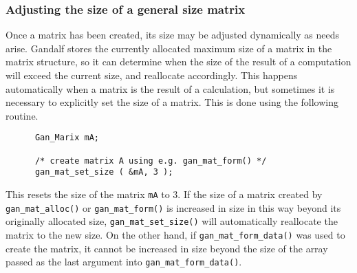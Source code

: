 \subsubsection{Adjusting the size of a general size matrix}
Once a matrix has been created, its size may be adjusted dynamically
as needs arise. Gandalf stores the currently allocated maximum size of
a matrix in the matrix structure, so it can determine when the size of
the result of a computation will exceed the current size, and reallocate
accordingly. This happens automatically when a matrix is the result
of a calculation, but sometimes it is necessary to explicitly set the
size of a matrix. This is done using the following routine.
\begin{verbatim}
      Gan_Marix mA;

      /* create matrix A using e.g. gan_mat_form() */
      gan_mat_set_size ( &mA, 3 );
\end{verbatim}
This resets the size of the matrix {\tt mA} to 3.
If the size of a matrix created
by {\tt gan\_mat\_alloc()} or {\tt gan\_mat\_form()} is increased in size
in this way beyond its originally allocated size, {\tt gan\_mat\_set\_size()}
will automatically reallocate the matrix to the new size.
On the other hand, if {\tt gan\_mat\_form\_data()} was used to create the
matrix, it cannot be increased in size beyond the size of the array
passed as the last argument into {\tt gan\_mat\_form\_data()}.


